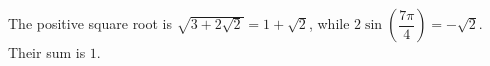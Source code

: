 The positive square root is $\sqrt{3+2\sqrt2}=1+\sqrt2$, while $2 \sin (\dfrac{7 \pi}{4}) = - \sqrt{2}$. Their sum is $\boxed1$.
